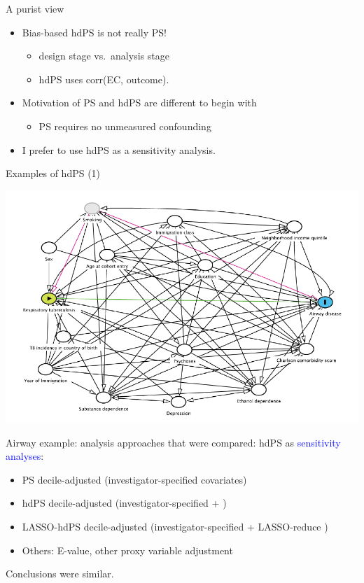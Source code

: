 \documentclass[
  ignorenonframetext,
  aspectratio=169]{beamer}
\providecommand{\tightlist}{%
  \setlength{\itemsep}{0pt}\setlength{\parskip}{0pt}}
\begin{document}
\begin{frame}{A purist view}
\protect\hypertarget{a-purist-view}{}
\begin{itemize}
\tightlist
\item
  Bias-based hdPS is not really PS!

  \begin{itemize}
  \tightlist
  \item
    design stage vs.~analysis stage
  \item
    hdPS uses corr(EC, outcome).
  \end{itemize}
\item
  Motivation of PS and hdPS are different to begin with

  \begin{itemize}
  \tightlist
  \item
    PS requires no unmeasured confounding
  \end{itemize}
\item
  I prefer to use hdPS as a sensitivity analysis.
\end{itemize}
\end{frame}

\begin{frame}{Examples of hdPS (1)}
\protect\hypertarget{examples-of-hdps-1}{}
\begin{center}
\includegraphics[width=0.3\linewidth]{dag.png}
\end{center}

Airway example: analysis approaches that were compared: hdPS as
\textcolor{blue}{sensitivity analyses}:

\begin{itemize}
\tightlist
\item
  PS decile-adjusted (investigator-specified covariates)
\item
  hdPS decile-adjusted (investigator-specified +
  \textcolor{blue}{})
\item
  LASSO-hdPS decile-adjusted (investigator-specified + LASSO-reduce
  \textcolor{blue}{})
\item
  Others: E-value, other proxy variable adjustment
\end{itemize}

Conclusions were similar.
\end{frame}
\end{document}
